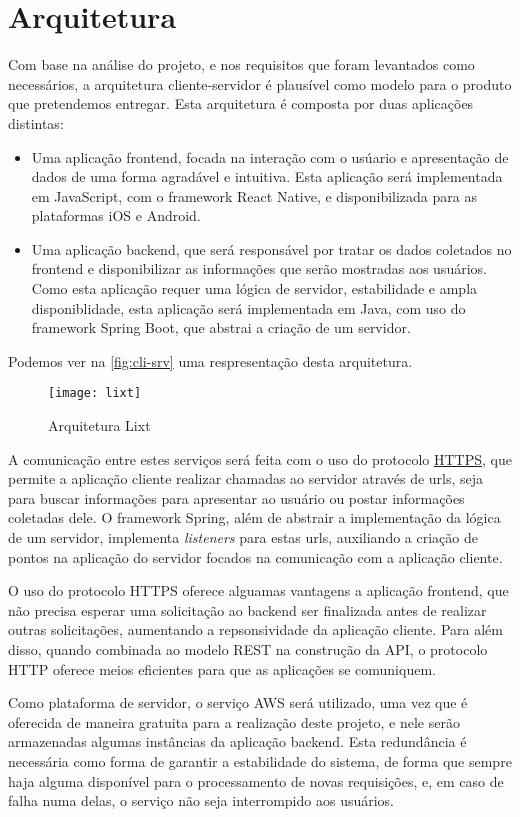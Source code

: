 \section{Arquitetura}

Com base na análise do projeto, e nos requisitos que foram levantados
como necessários, a arquitetura cliente-servidor é plausível como
modelo para o produto que pretendemos entregar.
Esta arquitetura é composta por duas aplicações distintas:
\begin{itemize}
\item Uma aplicação \gls{frontend}, focada na interação com o usúario
  e apresentação de dados de uma forma agradável e intuitiva. Esta
  aplicação será implementada em JavaScript, com o \gls{framework} React
  Native, e disponibilizada para as plataformas iOS e Android.
\item Uma aplicação \gls{backend}, que será responsável por tratar os
  dados coletados no \gls{frontend} e disponibilizar as informações
  que serão mostradas aos usuários. Como esta aplicação requer uma
  lógica de servidor, estabilidade e ampla disponiblidade, esta
  aplicação será implementada em Java, com uso do \gls{framework} Spring
  Boot, que abstrai a criação de um servidor.
\end{itemize}
Podemos ver na \autoref{fig:cli-srv} uma respresentação desta
arquitetura.

\begin{figure}[h]
  \centering
  \caption{Arquitetura Lixt}
  \label{fig:cli-srv}
  \texttt{[image: lixt]}
\end{figure}

A comunicação entre estes serviços será feita com o uso do protocolo
\label{sig:https}\hyperlink{s:http}{HTTPS}, que permite a aplicação
cliente realizar chamadas ao servidor através de urls, seja para
buscar informações para apresentar ao usuário ou postar informações
coletadas dele. O \gls{framework} Spring, além de abstrair a implementação
da lógica de um servidor, implementa \emph{listeners} para estas urls,
auxiliando a criação de pontos na aplicação do servidor focados na
comunicação com a aplicação cliente.

O uso do protocolo HTTPS oferece alguamas vantagens a aplicação
\gls{frontend}, que não precisa esperar uma solicitação ao
\gls{backend} ser finalizada antes de realizar outras solicitações,
aumentando a repsonsividade da aplicação cliente. Para além disso,
quando combinada ao modelo \label{sig:rest}\gls{REST} na
construção da \label{sig:API}\gls{API}, o protocolo HTTP
oferece meios eficientes para que as aplicações se comuniquem.

Como plataforma de servidor, o serviço AWS será utilizado, uma vez que
é oferecida de maneira gratuita para a realização deste projeto, e nele
serão armazenadas algumas instâncias da aplicação \gls{backend}.
Esta redundância é necessária como forma de garantir a estabilidade do
sistema, de forma que sempre haja alguma disponível para o
processamento de novas requisições, e, em caso de falha numa delas, o
serviço não seja interrompido aos usuários.

